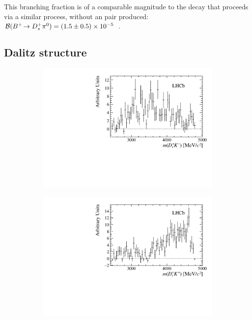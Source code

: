 This branching fraction is of a comparable magnitude to the decay \decay{\Bp}{\Dsp\piz} that proceeds via a similar process, without an \squark\squarkbar pair produced: $\mathcal{B}({{{B}^+}}\!\rightarrow {\ensuremath{{D}^+_{s}}} {\ensuremath{{\pi}^0}}) = (1.5 \pm 0.5) \times 10^{-5}$~\cite{Aubert:2006xy}.  

\subsection{Dalitz structure}


\begin{figure}[!h]
    \centering
    \begin{subfigure}[t]{0.4\textwidth}
        \includegraphics[width=1.0\textwidth]{figs/B2DsKK/DsKm_mass_sweighted.pdf}
    \end{subfigure}
    \begin{subfigure}[t]{0.4\textwidth}
        \includegraphics[width=1.0\textwidth]{figs/B2DsKK/DsKp_mass_sweighted.pdf}

\end{subfigure}
\end{figure}
